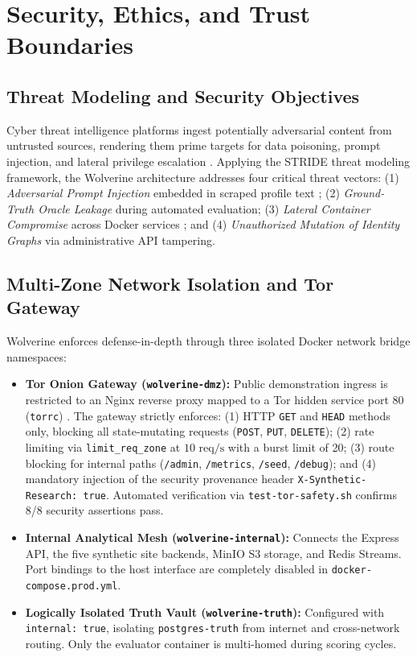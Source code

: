 \chapter{Security, Ethics, and Trust Boundaries}
\label{ch:security}

\section{Threat Modeling and Security Objectives}
\label{sec:sec_problem}

Cyber threat intelligence platforms ingest potentially adversarial content from untrusted sources, rendering them prime targets for data poisoning, prompt injection, and lateral privilege escalation \cite{shostack2014threat, nist2012guide}. Applying the STRIDE threat modeling framework, the Wolverine architecture addresses four critical threat vectors: (1) \textit{Adversarial Prompt Injection} embedded in scraped profile text \cite{perez2022ignore, greshake2023not}; (2) \textit{Ground-Truth Oracle Leakage} during automated evaluation; (3) \textit{Lateral Container Compromise} across Docker services \cite{sultan2019container}; and (4) \textit{Unauthorized Mutation of Identity Graphs} via administrative API tampering.

\section{Multi-Zone Network Isolation and Tor Gateway}
\label{sec:network_security}

Wolverine enforces defense-in-depth through three isolated Docker network bridge namespaces:

\begin{itemize}
    \item \textbf{Tor Onion Gateway (\texttt{wolverine-dmz}):} Public demonstration ingress is restricted to an Nginx reverse proxy mapped to a Tor hidden service port 80 (\texttt{torrc}) \cite{dingledine2004tor}. The gateway strictly enforces: (1) HTTP \texttt{GET} and \texttt{HEAD} methods only, blocking all state-mutating requests (\texttt{POST}, \texttt{PUT}, \texttt{DELETE}); (2) rate limiting via \texttt{limit\_req\_zone} at $10\text{ req/s}$ with a burst limit of 20; (3) route blocking for internal paths (\texttt{/admin}, \texttt{/metrics}, \texttt{/seed}, \texttt{/debug}); and (4) mandatory injection of the security provenance header \texttt{X-Synthetic-Research: true}. Automated verification via \texttt{test-tor-safety.sh} confirms 8/8 security assertions pass.
    \item \textbf{Internal Analytical Mesh (\texttt{wolverine-internal}):} Connects the Express API, the five synthetic site backends, MinIO S3 storage, and Redis Streams. Port bindings to the host interface are completely disabled in \texttt{docker-compose.prod.yml}.
    \item \textbf{Logically Isolated Truth Vault (\texttt{wolverine-truth}):} Configured with \texttt{internal: true}, isolating \texttt{postgres-truth} from internet and cross-network routing. Only the evaluator container is multi-homed during scoring cycles.
\end{itemize}


